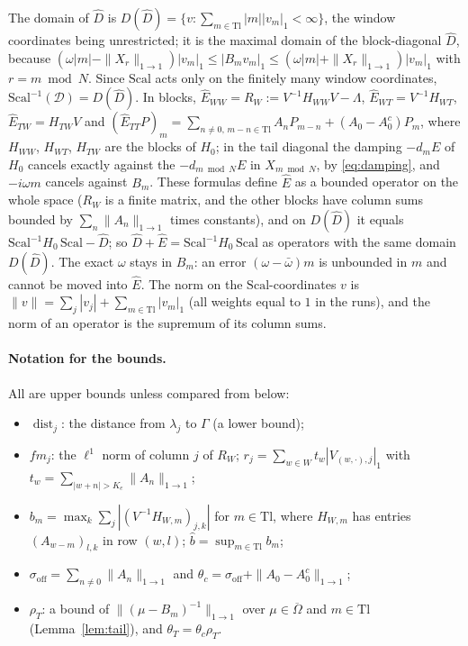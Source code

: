 \documentclass[11pt]{article}
\theoremstyle{definition}
\newcommand{\Dsp}{\mathcal{D}}
\begin{document}
The domain of $\hat D$ is $D(\hat D) = \{v : \sum_{m\in\mathrm{Tl}}|m||v_m|_1 < \infty\}$, the window coordinates being unrestricted; it is the maximal domain of the block-diagonal $\hat D$, because $(\omega|m| - \|X_r\|_{1\to1})|v_m|_1 \le |B_mv_m|_1 \le (\omega|m| + \|X_r\|_{1\to1})|v_m|_1$ with $r = m \bmod N$. Since $\mathrm{Scal}$ acts only on the finitely many window coordinates, $\mathrm{Scal}^{-1}(\Dsp) = D(\hat D)$. In blocks, $\hat E_{WW} = R_W := V^{-1}H_{WW}V - \Lambda$, $\hat E_{WT} = V^{-1}H_{WT}$, $\hat E_{TW} = H_{TW}V$ and $(\hat E_{TT}P)_m = \sum_{n \ne 0,\,m-n\in\mathrm{Tl}}A_nP_{m-n} + (A_0 - A_0^c)P_m$, where $H_{WW}$, $H_{WT}$, $H_{TW}$ are the blocks of $H_0$; in the tail diagonal the damping $-d_mE$ of $H_0$ cancels exactly against the $-d_{m \bmod N}E$ in $X_{m \bmod N}$, by \eqref{eq:damping}, and $-i\omega m$ cancels against $B_m$. These formulas define $\hat E$ as a bounded operator on the whole space ($R_W$ is a finite matrix, and the other blocks have column sums bounded by $\sum_n\|A_n\|_{1\to1}$ times constants), and on $D(\hat D)$ it equals $\mathrm{Scal}^{-1}H_0\,\mathrm{Scal} - \hat D$; so $\hat D + \hat E = \mathrm{Scal}^{-1}H_0\,\mathrm{Scal}$ as operators with the same domain $D(\hat D)$. The exact $\omega$ stays in $B_m$: an error $(\omega - \bar\omega)m$ is unbounded in $m$ and cannot be moved into $\hat E$. The norm on the $\mathrm{Scal}$-coordinates $v$ is $\|v\| = \sum_j|v_j| + \sum_{m\in\mathrm{Tl}}|v_m|_1$ (all weights equal to $1$ in the runs), and the norm of an operator is the supremum of its column sums.

\paragraph{Notation for the bounds.} All are upper bounds unless compared from below:
\begin{itemize}
\item $\operatorname{dist}_j$: the distance from $\lambda_j$ to $\Gamma$ (a lower bound);
\item $f\!m_j$: the $\ell^1$ norm of column $j$ of $R_W$; $r_j = \sum_{w\in W}t_w|V_{(w,\cdot),j}|_1$ with $t_w = \sum_{|w+n| > K_e}\|A_n\|_{1\to1}$;
\item $b_m = \max_k\sum_j|(V^{-1}H_{W,m})_{j,k}|$ for $m \in \mathrm{Tl}$, where $H_{W,m}$ has entries $(A_{w-m})_{l,k}$ in row $(w, l)$; $\hat b = \sup_{m\in\mathrm{Tl}}b_m$;
\item $\sigma_{\mathrm{off}} = \sum_{n\ne0}\|A_n\|_{1\to1}$ and $\theta_c = \sigma_{\mathrm{off}} + \|A_0 - A_0^c\|_{1\to1}$;
\item $\rho_T$: a bound of $\|(\mu - B_m)^{-1}\|_{1\to1}$ over $\mu \in \overline\Omega$ and $m \in \mathrm{Tl}$ (Lemma~\ref{lem:tail}), and $\theta_T = \theta_c\rho_T$.
\end{itemize}
\end{document}
